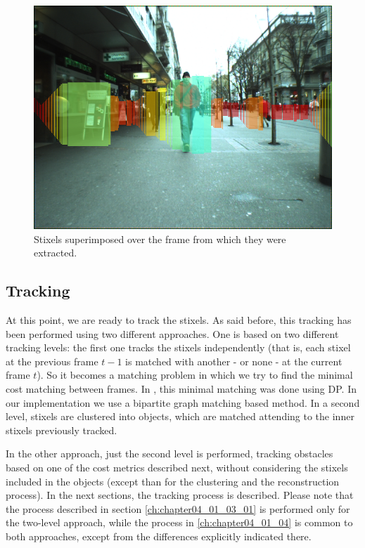 \begin{figure}[h!]
  \centering
  \includegraphics{stixels_over_original}
  \caption{Stixels superimposed over the frame from which they were extracted.}\label{fig:cp04_stixels}
\end{figure}

\subsection{Tracking}\label{ch:chapter04_01_03}

At this point, we are ready to track the stixels. As said before, this tracking has been performed using two different approaches. One is based on two different tracking levels: the first one tracks the stixels independently (that is, each stixel at the previous frame $t - 1$ is matched with another - or none - at the current frame $t$). So it becomes a matching problem in which we try to find the minimal cost matching between frames. In \cite{gunyel2012stixels}, this minimal matching was done using \ac{DP}. In our implementation we use a bipartite graph matching based method. In a second level, stixels are clustered into objects, which are matched attending to the inner stixels previously tracked.

In the other approach, just the second level is performed, tracking obstacles based on one of the cost metrics described next, without considering the stixels included in the objects (except than for the clustering and the reconstruction process). In the next sections, the tracking process is described. Please note that the process described in section \ref{ch:chapter04_01_03_01} is performed only for the two-level approach, while the process in \ref{ch:chapter04_01_04} is common to both approaches, except from the differences explicitly indicated there.

